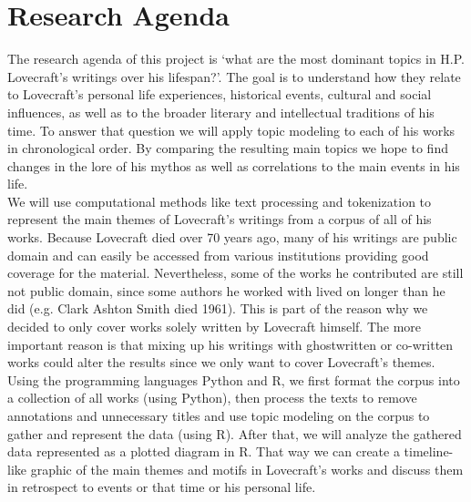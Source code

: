 \section{Research Agenda}

The research agenda of this project is ‘what are the most dominant topics in H.P. Lovecraft’s 
writings over his lifespan?’. The goal is to understand how they relate to Lovecraft’s personal 
life experiences, historical events, cultural and social influences, as well as to the broader 
literary and intellectual traditions of his time. To answer that question we will apply topic 
modeling to each of his works in chronological order. By comparing the resulting main topics 
we hope to find changes in the lore of his mythos as well as correlations to the main events 
in his life.\\

We will use computational methods like text processing and tokenization to 
represent the main themes of Lovecraft’s writings from a corpus of all of his works. Because 
Lovecraft died over 70 years ago, many of his writings are public domain and can easily be 
accessed from various institutions providing good coverage for the material. Nevertheless, 
some of the works he contributed are still not public domain, since some authors he worked 
with lived on longer than he did (e.g. Clark Ashton Smith died 1961). This is part of the 
reason why we decided to only cover works solely written by Lovecraft himself. The more 
important reason is that mixing up his writings with ghostwritten or co-written works could 
alter the results since we only want to cover Lovecraft’s themes. Using the programming 
languages Python and R, we first format the corpus into a collection of all works (using 
Python), then process the texts to remove annotations and unnecessary titles and use topic 
modeling on the corpus to gather and represent the data (using R). After that, we will analyze 
the gathered data represented as a plotted diagram in R. That way we can create a timeline-like 
graphic of the main themes and motifs in Lovecraft’s works and discuss them in retrospect to 
events or that time or his personal life.\\

